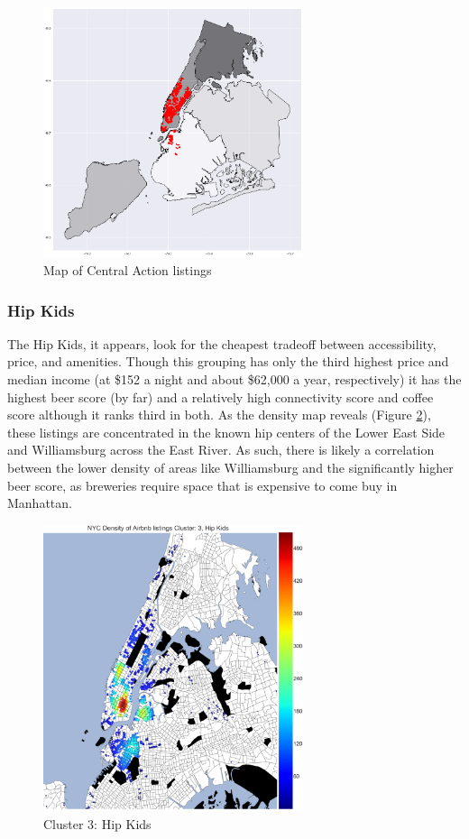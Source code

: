 \documentclass[conference]{IEEEtran}
\begin{document}
\begin{figure}[h]
\centering
\includegraphics[width=3in]{group-3}
\caption{Map of Central Action listings}
\label{centralaction-map}
\end{figure}

\subsubsection{Hip Kids}
The Hip Kids, it appears, look for the cheapest tradeoff between accessibility, price, and amenities. Though this grouping has only
the third highest price and median income (at \$152 a night and about \$62,000 a year, respectively) it has the highest beer score
(by far) and a relatively high connectivity score and coffee score although it ranks third in both. As the density map reveals 
(Figure \ref{Clusterhip}), these listings are concentrated in the known hip centers of the Lower East Side and Williamsburg across
the East River. As such, there is likely a correlation between the lower density of areas like Williamsburg and the significantly
higher beer score, as breweries require space that is expensive to come buy in Manhattan.

\begin{figure}[h]
\centering
\includegraphics[width=3in]{Clusterhip}
\caption{Cluster 3: Hip Kids}
\label{Clusterhip}
\end{figure}
\end{document}
